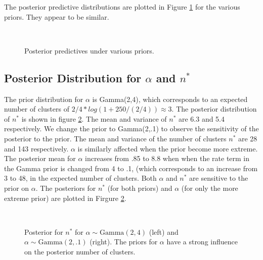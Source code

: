 \documentclass{article}
\def\beginmyfig{\begin{figure}[h]\center}
\def\endmyfig{\end{figure}}
\begin{document}

\noindent
The posterior predictive distributions are plotted in Figure
\ref{fig:postpreds1} for the various priors. They appear to be similar.\\
\begin{figure}[h]
  \center
  \hfill
   \\
  \hfill
  \caption{Posterior predictives under various priors.}
  \label{fig:postpreds1}
\end{figure}


\subsection{Posterior Distribution for $\alpha$ and $n^*$}
The prior distribution for $\alpha$ is Gamma(2,4), which corresponds to an
expected number of clusters of $2/4 * log(1 + 250 /(2/4) ) \approx 3$.  The
posterior distribution of $n^*$ is shown in figure \ref{fig:nstar1}.  The mean
and variance of $n^*$ are 6.3 and 5.4 respectively. We change the prior to
Gamma(2,.1) to observe the sensitivity of the posterior to the prior. The mean
and variance of the number of clusters $n^*$ are 28 and 143 respectively.
$\alpha$ is similarly affected when the prior become more extreme.  The
posterior mean for $\alpha$ increases from .85 to 8.8 when when the rate term
in the Gamma prior is changed from 4 to .1, (which corresponds to an increase
from 3 to 48, in the expected number of clusters. Both $\alpha$ and $n^*$ are
sensitive to the prior on $\alpha$. The posteriors for $n^*$ (for both priors)
and $\alpha$ (for only the more extreme prior) are plotted in Firgure
\ref{fig:nstar1}. 
\beginmyfig
  \\
  \caption{Posterior for $n^*$ for $\alpha \sim \text{Gamma}(2,4)$ (left) and
  $\alpha \sim \text{Gamma}(2,.1)$ (right). The priors for $\alpha$ have a strong
  influence on the posterior number of clusters.}
  \label{fig:nstar1}
\endmyfig
\end{document}
